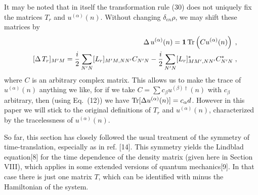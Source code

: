 \documentclass[12pt]{article}
\def\BM#1{\mbox{\boldmath{$#1$}}}
\begin{document}
It may be noted that in itself the transformation rule (30) does not uniquely fix the matrices $T_r$ and $u^{(\alpha)}(n)$.  Without changing $\delta_{\epsilon n}\rho$, we may shift these matrices by
\begin{eqnarray*}
&& \Delta \,u^{(\alpha)}(n)={\BM 1}\,{\rm Tr}\left(C u^{(\alpha)}(n)\right)\;,\\
&& [\Delta \,T_r]_{M'M}=\frac{i}{2}\sum_{N'N} [L_r]_{M'M,NN'}C_{N'N}-\frac{i}{2}\sum_{N'N} [L_r]^*_{MM',NN'}C^*_{N'N}\;,
\end{eqnarray*}
where $C$ is an arbitrary complex matrix.  This allows us to make the trace of $u^{(\alpha)}(n)$ anything we like, for if we take $C=\sum c_\beta u^{(\beta)\dagger}(n)$ with $c_\beta$ arbitrary, then (using Eq.~(12)) we have ${\rm Tr}[\Delta u^{(\alpha)}(n)]=c_\alpha d$.  However in this paper we will stick to the original definitions of 
$T_r$ and $u^{(\alpha)}(n)$, characterized by the tracelessness of $u^{(\alpha)}(n)$.

So far,  this section has closely followed the usual treatment of the symmetry of time-translation, especially as in  ref. [14].  This symmetry  yields the Lindblad  equation[8] for the time dependence of the density matrix (given here in Section VIII), which applies in some extended versions of quantum mechanics[9].  In that case there is just one matrix  $T$, which can be identified with minus the Hamiltonian of the system.
\end{document}
